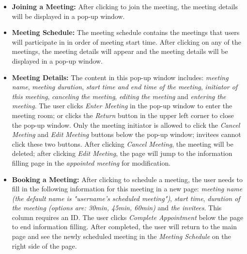 \documentclass{article}
\begin{document}
\begin{itemize}
  \item \textbf{Joining a Meeting:} After clicking to join the meeting, the meeting details will be displayed in a pop-up window.
  \item \textbf{Meeting Schedule:} The meeting schedule contains the meetings that users will participate in in order of meeting start time. After clicking on any of the meetings, the meeting details will appear and the meeting details will be displayed in a pop-up window.
  \item \textbf{Meeting Details:} The content in this pop-up window includes: \textit{meeting name}, \textit{meeting duration}, \textit{start time and end time of the meeting}, \textit{initiator of this meeting}, \textit{canceling the meeting}, \textit{editing the meeting} and \textit{entering the meeting}. The user clicks \textit{Enter Meeting} in the pop-up window to enter the meeting room; or clicks the \textit{Return} button in the upper left corner to close the pop-up window. Only the meeting initiator is allowed to click the \textit{Cancel Meeting} and \textit{Edit Meeting} buttons below the pop-up window; invitees cannot click these two buttons. After clicking \textit{Cancel Meeting}, the meeting will be deleted; after clicking \textit{Edit Meeting}, the page will jump to the information filling page in the \textit{appointed meeting} for modification.
  \item \textbf{Booking a Meeting:} After clicking to schedule a meeting, the user needs to fill in the following information for this meeting in a new page: \textit{meeting name (the default name is "username's scheduled meeting")}, \textit{start time}, \textit{duration of the meeting (options are: 30min, 45min, 60min)} and \textit{the invitees}. This column requires an ID. The user clicks \textit{Complete Appointment} below the page to end information filling. After completed, the user will return to the main page and see the newly scheduled meeting in the \textit{Meeting Schedule} on the right side of the page.
\end{itemize}
\end{document}
